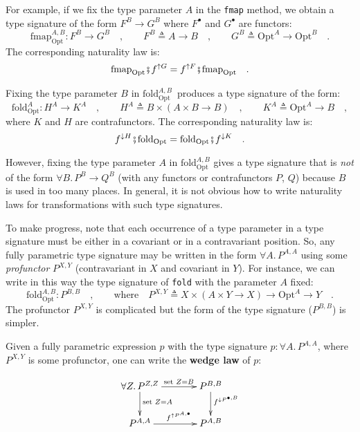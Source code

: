 For example, if we fix the type parameter $A$ in the \lstinline!fmap!
method, we obtain a type signature of the form $F^{B}\rightarrow G^{B}$
where $F^{\bullet}$ and $G^{\bullet}$ are functors:
\[
\text{fmap}_{\text{Opt}}^{A,B}:F^{B}\rightarrow G^{B}\quad,\quad\quad F^{B}\triangleq A\rightarrow B\quad,\quad\quad G^{B}\triangleq\text{Opt}^{A}\rightarrow\text{Opt}^{B}\quad.
\]
The corresponding naturality law is:
\[
\text{fmap}_{\text{Opt}}\bef f^{\uparrow G}=f^{\uparrow F}\bef\text{fmap}_{\text{Opt}}\quad.
\]

Fixing the type parameter $B$ in $\text{fold}_{\text{Opt}}^{A,B}\,$
produces a type signature of the form:
\[
\text{fold}_{\text{Opt}}^{A}:H^{A}\rightarrow K^{A}\quad,\quad\quad H^{A}\triangleq B\times\left(A\times B\rightarrow B\right)\quad,\quad\quad K^{A}\triangleq\text{Opt}^{A}\rightarrow B\quad,
\]
where $K$ and $H$ are contrafunctors. The corresponding naturality
law is:
\[
f^{\downarrow H}\bef\text{fold}_{\text{Opt}}=\text{fold}_{\text{Opt}}\bef f^{\downarrow K}\quad.
\]

However, fixing the type parameter $A$ in $\text{fold}_{\text{Opt}}^{A,B}$
gives a type signature that is \emph{not} of the form $\forall B.\,P^{B}\rightarrow Q^{B}$
(with any functors or contrafunctors $P$, $Q$) because $B$ is used
in too many places. In general, it is not obvious how to write naturality
laws for transformations with such type signatures. 

To make progress, note that each occurrence of a type parameter in
a type signature must be either in a covariant or in a contravariant
position. So, any fully parametric type signature may be written in
the form $\forall A.\,P^{A,A}$ using some \emph{profunctor} $P^{X,Y}$
(contravariant in $X$ and covariant in $Y$). For instance, we can
write in this way the type signature of \lstinline!fold! with the
parameter $A$ fixed:
\[
\text{fold}_{\text{Opt}}^{A,B}:P^{B,B}\quad,\quad\quad\text{where}\quad P^{X,Y}\triangleq X\times(A\times Y\rightarrow X)\rightarrow\text{Opt}^{A}\rightarrow Y\quad.
\]
The profunctor $P^{X,Y}$ is complicated but the form of the type
signature ($P^{B,B}$) is simpler.

Given a fully parametric expression $p$ with the type signature $p:\forall A.\,P^{A,A}$,
where $P^{X,Y}$ is some profunctor, one can write the \textbf{wedge
law} of $p$:

\begin{wrapfigure}[9]{l}{0.26\columnwidth}%
\vspace{-1.3\baselineskip}
\[
\xymatrix{\xyScaleY{2.0pc}\xyScaleX{3.0pc}\forall Z.\,P^{Z,Z}\ar[d]\sp(0.4){\text{set }Z=A}\ar[r]\sp(0.55){\text{set }Z=B} & P^{B,B}\ar[d]\sp(0.37){f^{\downarrow P^{\bullet,B}}}\\
P^{A,A}\ar[r]\sp(0.55){f^{\uparrow P^{A,\bullet}}} & P^{A,B}
}
\]

\vspace{-0.4\baselineskip}
\end{wrapfigure}%

